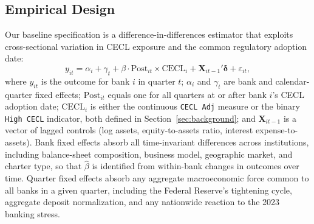 \subsection{Empirical Design}
\label{sec:identification:did}

Our baseline specification is a difference-in-differences estimator that
exploits cross-sectional variation in CECL exposure and the common
regulatory adoption date:
\begin{equation}
  y_{it}
  = \alpha_i + \gamma_t
  + \beta \cdot \mathrm{Post}_{it} \times \mathrm{CECL}_i
  + \mathbf{X}_{it-1}'\boldsymbol{\delta}
  + \varepsilon_{it},
  \label{eq:did}
\end{equation}
where $y_{it}$ is the outcome for bank $i$ in quarter $t$; $\alpha_i$ and
$\gamma_t$ are bank and calendar-quarter fixed effects; $\mathrm{Post}_{it}$
equals one for all quarters at or after bank $i$'s CECL adoption date;
$\mathrm{CECL}_i$ is either the continuous \texttt{CECL Adj} measure or the
binary \texttt{High CECL} indicator, both defined in
Section~\ref{sec:background}; and $\mathbf{X}_{it-1}$ is a vector of lagged
controls (log assets, equity-to-assets ratio, interest expense-to-assets).
Bank fixed effects absorb all time-invariant differences across institutions,
including balance-sheet composition, business model, geographic market, and
charter type, so that $\hat{\beta}$ is identified from within-bank changes
in outcomes over time.  Quarter fixed effects absorb any aggregate
macroeconomic force common to all banks in a given quarter, including the
Federal Reserve's tightening cycle, aggregate deposit normalization, and any
nationwide reaction to the 2023 banking stress.

